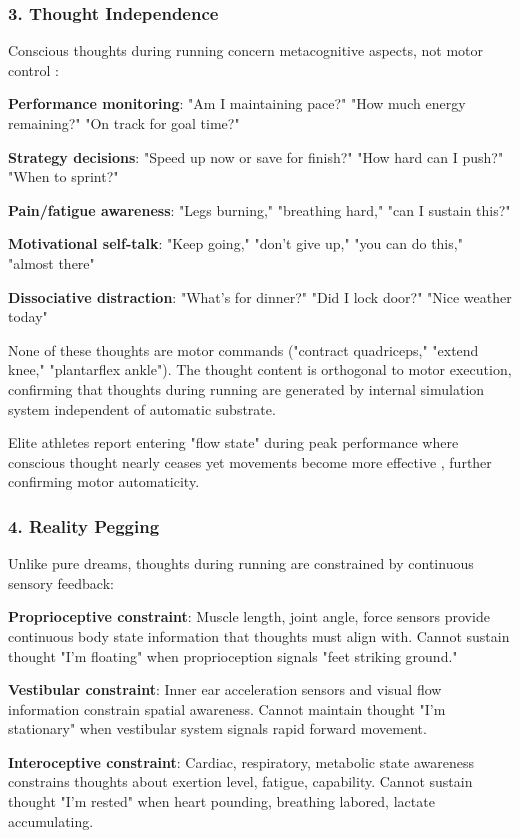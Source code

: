\documentclass[11pt,onecolumn]{article}
\begin{document}
\subsubsection{3. Thought Independence}

Conscious thoughts during running concern metacognitive aspects, not motor control \citep{brick2014thinking}:

\textbf{Performance monitoring}: "Am I maintaining pace?" "How much energy remaining?" "On track for goal time?"

\textbf{Strategy decisions}: "Speed up now or save for finish?" "How hard can I push?" "When to sprint?"

\textbf{Pain/fatigue awareness}: "Legs burning," "breathing hard," "can I sustain this?"

\textbf{Motivational self-talk}: "Keep going," "don't give up," "you can do this," "almost there"

\textbf{Dissociative distraction}: "What's for dinner?" "Did I lock door?" "Nice weather today"

None of these thoughts are motor commands ("contract quadriceps," "extend knee," "plantarflex ankle"). The thought content is orthogonal to motor execution, confirming that thoughts during running are generated by internal simulation system independent of automatic substrate.

Elite athletes report entering "flow state" during peak performance where conscious thought nearly ceases yet movements become more effective \citep{jackson1995factors}, further confirming motor automaticity.

\subsubsection{4. Reality Pegging}

Unlike pure dreams, thoughts during running are constrained by continuous sensory feedback:

\textbf{Proprioceptive constraint}: Muscle length, joint angle, force sensors provide continuous body state information that thoughts must align with. Cannot sustain thought "I'm floating" when proprioception signals "feet striking ground."

\textbf{Vestibular constraint}: Inner ear acceleration sensors and visual flow information constrain spatial awareness. Cannot maintain thought "I'm stationary" when vestibular system signals rapid forward movement.

\textbf{Interoceptive constraint}: Cardiac, respiratory, metabolic state awareness constrains thoughts about exertion level, fatigue, capability. Cannot sustain thought "I'm rested" when heart pounding, breathing labored, lactate accumulating.
\end{document}
